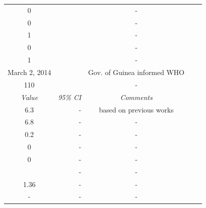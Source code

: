 \documentclass[10pt, journal,onecolumn]{IEEEtran}
\begin{document}
\begin{appendix}
\begin{table}[h]
{\begin{tabular}{@{}crccc@{}}
 0& & -\\
 0& & -\\
 1& & -\\
 0& & -\\
 1& &-\\
 March 2, 2014 &  & Gov. of Guinea informed WHO\\
110 & & -\\
\midrule
 \textit{Value} & \textit{95\% CI} & \textit{Comments} \\
\midrule
6.3 & - & based on previous works \cite{}\\
6.8 & - & -\\
0.2 & - & -\\
0 & - & -\\
0 & - & -\\
 & - & -\\
1.36 &- &-\\
- & - &-\\
\end{tabular}
}
\label{Table:parameter2}
\end{table}


\end{appendix}
\end{document}
